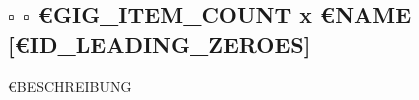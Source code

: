 \documentclass[../list/inventory_full.tex]{subfiles}
\begin{document}
\subsection*{$\square$ $\square$ €{GIG_ITEM_COUNT} x €{NAME} [€{ID_LEADING_ZEROES}]}
€{BESCHREIBUNG}
\end{document}
